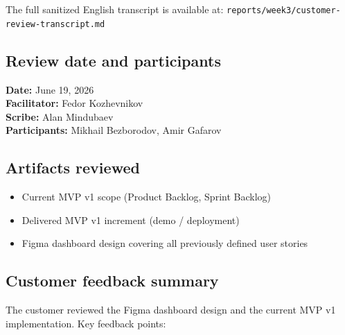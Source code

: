 \documentclass[11pt,a4paper]{article}
\begin{document}
The full sanitized English transcript is available at:
\texttt{reports/week3/customer-review-transcript.md}

\subsection{Review date and participants}
\textbf{Date:} June 19, 2026 \\
\textbf{Facilitator:} Fedor Kozhevnikov \\
\textbf{Scribe:} Alan Mindubaev \\
\textbf{Participants:} Mikhail Bezborodov, Amir Gafarov

\subsection{Artifacts reviewed}
\begin{itemize}
    \item Current MVP v1 scope (Product Backlog, Sprint Backlog)
    \item Delivered MVP v1 increment (demo / deployment)
    \item Figma dashboard design covering all previously defined user stories
\end{itemize}

\subsection{Customer feedback summary}
The customer reviewed the Figma dashboard design and the current MVP v1 implementation. Key feedback points:
\end{document}
